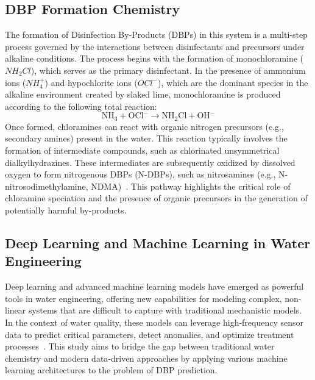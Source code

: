 \documentclass[a4paper]{article}
\begin{document}
\subsection{DBP Formation Chemistry}
The formation of Disinfection By-Products (DBPs) in this system is a multi-step process governed by the interactions between disinfectants and precursors under alkaline conditions. The process begins with the formation of monochloramine ($NH_2Cl$), which serves as the primary disinfectant. In the presence of ammonium ions ($NH_4^+$) and hypochlorite ions ($OCl^-$), which are the dominant species in the alkaline environment created by slaked lime, monochloramine is produced according to the following total reaction:
\begin{equation}
    \text{NH}_3 + \text{OCl}^- \rightarrow \text{NH}_2\text{Cl} + \text{OH}^-
\end{equation}
Once formed, chloramines can react with organic nitrogen precursors (e.g., secondary amines) present in the water. This reaction typically involves the formation of intermediate compounds, such as chlorinated unsymmetrical dialkylhydrazines. These intermediates are subsequently oxidized by dissolved oxygen to form nitrogenous DBPs (N-DBPs), such as nitrosamines (e.g., N-nitrosodimethylamine, NDMA)~\cite{hua2015formation}. This pathway highlights the critical role of chloramine speciation and the presence of organic precursors in the generation of potentially harmful by-products.

\subsection{Deep Learning and Machine Learning in Water Engineering}
Deep learning and advanced machine learning models have emerged as powerful tools in water engineering, offering new capabilities for modeling complex, non-linear systems that are difficult to capture with traditional mechanistic models. In the context of water quality, these models can leverage high-frequency sensor data to predict critical parameters, detect anomalies, and optimize treatment processes~\cite{zhang2020review}. This study aims to bridge the gap between traditional water chemistry and modern data-driven approaches by applying various machine learning architectures to the problem of DBP prediction.
\end{document}
